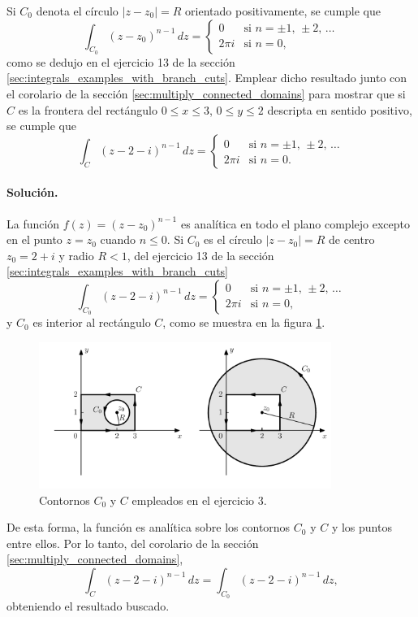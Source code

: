 \documentclass[a4paper]{report}
\begin{document}
Si \(C_0\) denota el círculo \(|z-z_0|=R\) orientado positivamente, se cumple que
\[
 \int_{C_0}(z-z_0)^{n-1}\,dz=
 \left\{ 
 \begin{array}{ll}
  0 &\textrm{si }n=\pm1,\,\pm2,\,\dots\\
  2\pi i&\textrm{si }n=0,
 \end{array}
 \right.
\]
como se dedujo en el ejercicio 13 de la sección \ref{sec:integrals_examples_with_branch_cuts}. 
Emplear dicho resultado junto con el corolario de la sección \ref{sec:multiply_connected_domains} para mostrar que si \(C\) es la frontera del rectángulo \(0\leq x\leq3\), \(0\leq y\leq2\) descripta en sentido positivo, se cumple que 
\[
 \int_{C}(z-2-i)^{n-1}\,dz=
 \left\{ 
 \begin{array}{ll}
  0 &\textrm{si }n=\pm1,\,\pm2,\,\dots\\
  2\pi i&\textrm{si }n=0.
 \end{array}
 \right.
\]

\paragraph{Solución.} La función \(f(z)=(z-z_0)^{n-1}\) es analítica en todo el plano complejo excepto en el punto \(z=z_0\) cuando \(n\leq0\). Si \(C_0\) es el círculo \(|z-z_0|=R\) de centro \(z_0=2+i\) y radio \(R<1\), del ejercicio 13 de la sección \ref{sec:integrals_examples_with_branch_cuts}
\[
 \int_{C_0}(z-2-i)^{n-1}\,dz=
 \left\{ 
 \begin{array}{ll}
  0 &\textrm{si }n=\pm1,\,\pm2,\,\dots\\
  2\pi i&\textrm{si }n=0,
 \end{array}
 \right.
\]
y \(C_0\) es interior al rectángulo \(C\), como se muestra en la figura \ref{fig:exercise_53_03}.
\begin{figure}[!htb]
 \begin{center}
 \includegraphics[width=0.85\textwidth]{figuras/exercise_53_03.pdf}
 \caption{\label{fig:exercise_53_03} Contornos \(C_0\) y \(C\) empleados en el ejercicio 3.}
 \end{center}
\end{figure}
De esta forma, la función es analítica sobre los contornos \(C_0\) y \(C\) y los puntos entre ellos. Por lo tanto, del corolario de la sección \ref{sec:multiply_connected_domains},
\[
 \int_{C}(z-2-i)^{n-1}\,dz=\int_{C_0}(z-2-i)^{n-1}\,dz,
\]
obteniendo el resultado buscado.
\end{document}
